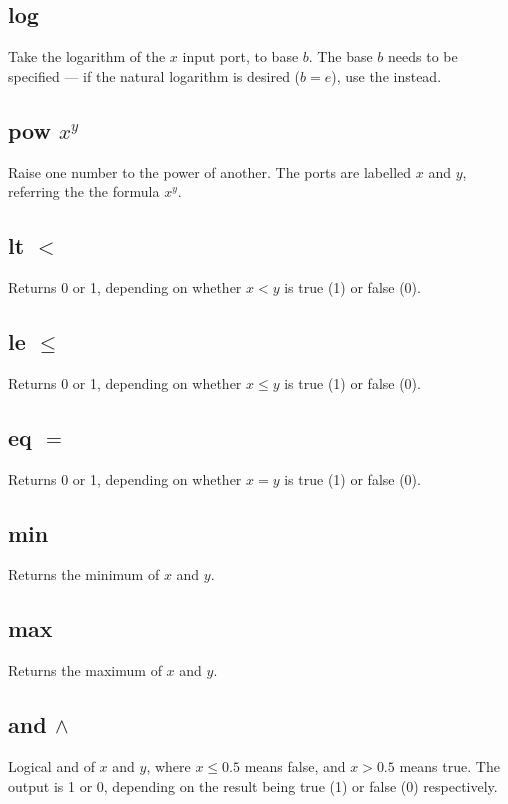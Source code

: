 \subsection{log}\label{Operation:log} Take the logarithm of the $x$ input port, to
base $b$. The base $b$ needs to be specified --- if the natural
logarithm is desired ($b=e$), use the  instead.

\subsection{pow $x^y$}\label{Operation:pow} Raise one number to the power of another. The
ports are labelled $x$ and $y$, referring the the formula $x^y$.

\subsection{lt $<$}\label{Operation:lt} Returns 0 or 1, depending
on whether $x<y$ is true (1) or false (0).

\subsection{le $\le$}\label{Operation:le} Returns 0 or 1, depending
on whether $x\le y$ is true (1) or false (0).

\subsection{eq $=$}\label{Operation:eq} Returns 0 or 1, depending
on whether $x=y$ is true (1) or false (0).

\subsection{min}\label{Operation:min} Returns the minimum of $x$ and
$y$.

\subsection{max}\label{Operation:max} Returns the maximum of $x$ and
$y$.

\subsection{and $\wedge$}\label{Operation:and_} Logical and of $x$ and $y$, where
$x\le 0.5$ means false, and $x>0.5$ means true. The output is 1 or 0,
depending on the result being true (1) or false (0) respectively.

